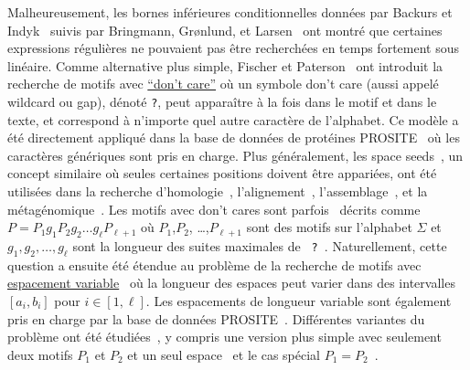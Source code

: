 Malheureusement, les bornes inférieures conditionnelles données par Backurs et Indyk~\cite{DBLP:conf/focs/BackursI16} suivis par Bringmann, Gr{\o}nlund, et Larsen~\cite{8104068} ont montré que certaines expressions régulières ne pouvaient pas être recherchées en temps fortement sous linéaire.
Comme alternative plus simple, Fischer et Paterson~\cite{FischerPaterson} ont introduit la recherche de motifs avec \underline{``don't care''} où un symbole don't care (aussi appelé wildcard ou gap), dénoté \texttt{?}, peut apparaître à la fois dans le motif et dans le texte, et correspond à n'importe quel autre caractère de l'alphabet.
Ce modèle a été directement appliqué dans la base de données  de protéines PROSITE~\cite{hulo2006prosite} où les caractères génériques sont pris en charge. Plus généralement, les space seeds~\cite{li2004patternhunter}, un concept similaire où seules certaines positions doivent être appariées, ont été utilisées dans la recherche d'homologie~\cite{ma2002patternhunter}, l'alignement~\cite{david2011shrimp2}, l'assemblage~\cite{birol2015spaced}, et la métagénomique~\cite{bvrinda2015spaced}.
Les motifs avec don't cares sont parfois~\cite{lewenstein2011indexing} décrits comme $P= P_1g_1P_2g_2 \dots g_\ell P_{\ell+1}$ où $P_1$,$P_2$, \dots,$P_{\ell+1}$ sont des motifs sur l'alphabet $\Sigma$ et $g_1,g_2,\dots,g_{\ell}$ sont la longueur des suites maximales de \texttt{ ? }. 
Naturellement, cette question a ensuite été étendue au problème de la recherche de motifs avec \underline{espacement variable}~\cite{bille2012string,bille2014string} où la longueur des espaces peut varier dans des intervalles $[a_i,b_i]$ pour $i\in[1,\ell]$.
Les espacements de longueur variable sont également pris en charge par la base de données PROSITE~\cite{hulo2006prosite}.
Différentes variantes du problème ont été étudiées~\cite{kopelowitz2016color,cohen2009range,brodal1999finding}, y compris une version plus simple avec seulement deux motifs $P_1$ et $P_2$ et un seul espace~\cite{peterlongo2006gapped,iliopoulos2009indexing} et le cas spécial $P_1=P_2$~\cite{muthukrishnan2002efficient,keller2007range}.

